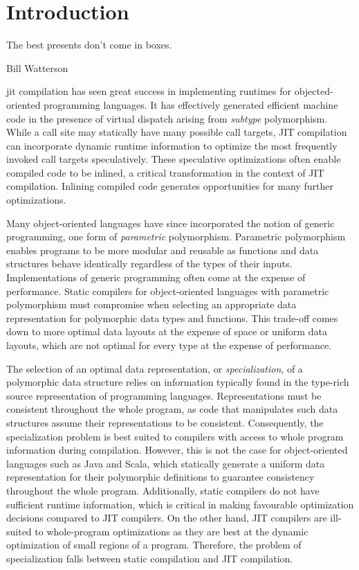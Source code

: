 \chapter{Introduction}

\epigraph{The best presents don't come in boxes.}{Bill Watterson}

\acrfull{jit} compilation has seen great success in implementing runtimes for objected-oriented programming languages.
It has effectively generated efficient machine code in the presence of virtual dispatch arising from \textit{subtype} polymorphism\cite{smalltalk:inline-caches,self:polymorphic-inline-caches}.
While a call site may statically have many possible call targets, JIT compilation can incorporate dynamic runtime information to optimize the most frequently invoked call targets speculatively.
These speculative optimizations often enable compiled code to be inlined, a critical transformation in the context of JIT compilation.
Inlining compiled code generates opportunities for many further optimizations.

Many object-oriented languages have since incorporated the notion of generic programming, one form of \textit{parametric} polymorphism.
Parametric polymorphism enables programs to be more modular and reusable as functions and data structures behave identically\cite{tapl} regardless of the types of their inputs.
Implementations of generic programming often come at the expense of performance.
Static compilers for object-oriented languages with parametric polymorphism must compromise when selecting an appropriate data representation for polymorphic data types and functions.
This trade-off comes down to more optimal data layouts at the expense of space or uniform data layouts, which are not optimal for every type at the expense of performance.

The selection of an optimal data representation, or \textit{specialization}, of a polymorphic data structure relies on information typically found in the type-rich source representation of programming languages.
Representations must be consistent throughout the whole program, as code that manipulates such data structures assume their representations to be consistent.
Consequently, the specialization problem is best suited to compilers with access to whole program information during compilation.
However, this is not the case for object-oriented languages such as Java and Scala, which statically generate a uniform data representation for their polymorphic definitions to guarantee consistency throughout the whole program. 
Additionally, static compilers do not have sufficient runtime information, which is critical in making favourable optimization decisions compared to JIT compilers.
On the other hand, JIT compilers are ill-suited to whole-program optimizations as they are best at the dynamic optimization of small regions of a program\cite{history:jit}.
Therefore, the problem of specialization falls between static compilation and JIT compilation.

